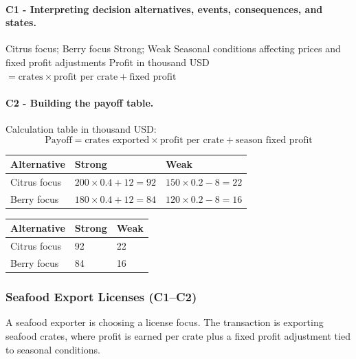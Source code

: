 	\paragraph*{C1 - Interpreting decision alternatives, events, consequences, and states.}
	\label{subsec:problem22-fruit-export-permits-c1}
	\DecisionElementsTable
	{Citrus focus; Berry focus}
	{Strong; Weak}
	{Seasonal conditions affecting prices and fixed profit adjustments}
	{Profit in thousand USD $= \text{crates} \times \text{profit per crate} + \text{fixed profit}$}


	\paragraph*{C2 - Building the payoff table.}
	\label{subsec:problem22-fruit-export-permits-c2}
	Calculation table in thousand USD:
	\[
	\text{Payoff}=\text{crates exported}\times\text{profit per crate}+\text{season fixed profit}
	\]
	\begin{center}
		\begin{tabular}{lll}
			\toprule
			Alternative & Strong & Weak \\
			\midrule
			Citrus focus & $200 \times 0.4 + 12 = 92$ & $150 \times 0.2 - 8 = 22$ \\
			Berry focus & $180 \times 0.4 + 12 = 84$ & $120 \times 0.2 - 8 = 16$ \\
			\bottomrule
		\end{tabular}
	\end{center}

	\begin{center}
		\begin{tabular}{lll}
			\toprule
			Alternative & Strong & Weak \\
			\midrule
			Citrus focus & 92 & 22 \\
			Berry focus & 84 & 16 \\
			\bottomrule
		\end{tabular}
	\end{center}


	\subsubsection{Seafood Export Licenses (C1--C2)}
	\label{sec:problem23-seafood-export-licenses-c1-c2}
	A seafood exporter is choosing a license focus. The transaction is exporting seafood crates, where profit is earned per crate plus a fixed profit adjustment tied to seasonal conditions.

